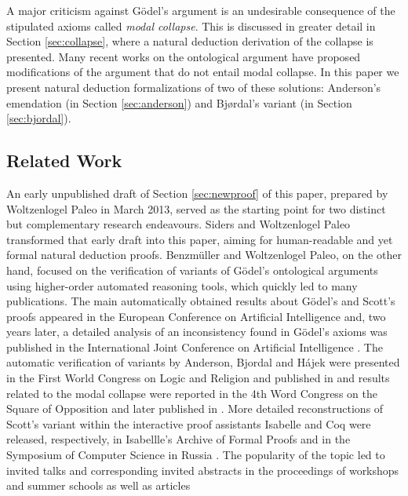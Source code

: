 \documentclass[smallextended]{svjour3}
\begin{document}
A major criticism against G\"odel's argument is an undesirable consequence of the stipulated axioms called \emph{modal collapse}. This is discussed in greater detail in Section \ref{sec:collapse}, where a natural deduction derivation of the collapse is presented. Many recent works on the ontological argument have proposed modifications of the argument that do not entail modal collapse. In this paper we present natural deduction formalizations of two of these solutions: Anderson's emendation (in Section \ref{sec:anderson}) and Bj{\o}rdal's variant (in Section \ref{sec:bjordal}).

\subsection{Related Work}

An early unpublished draft of Section \ref{sec:newproof} of this paper,
prepared by Woltzenlogel Paleo in March 2013, served as the starting
point for two distinct but complementary research endeavours. Siders
and Woltzenlogel Paleo transformed that early draft into this paper,
aiming for human-readable and yet formal natural deduction proofs.
Benzm\"uller and Woltzenlogel Paleo, on the other hand, focused on the
verification of variants of G\"odel's ontological arguments using
higher-order automated reasoning tools, which quickly led to many
publications. The main automatically obtained results about G\"odel's
and Scott's proofs appeared in the European Conference on Artificial
Intelligence \citep{ECAI2014} and, two years later, a detailed
analysis of an inconsistency found in G\"odel's axioms was published
in the International Joint Conference on Artificial Intelligence
\citep{IJCAI2016}. The automatic verification of variants by Anderson,
Bjordal and H\'ajek were presented in the First
World Congress on Logic and Religion
\citep{WorldCongressLogicAndReligion} and published in
\citep{controversy} and results related to the modal
collapse were reported in the 4th Word Congress on the Square of
Opposition \citep{SquareOfOpposition} and later published in
\citep{ModalCollapse}. More detailed reconstructions of Scott's
variant within the interactive proof assistants Isabelle and Coq were
released, respectively, in Isabellle's Archive of Formal Proofs
\citep{IsabelleGod} and in the Symposium of Computer Science in Russia
\citep{CSRModalLogicInCoq}. The popularity of the topic led to invited
talks and corresponding invited abstracts in the proceedings of
workshops \citep{WADT,WADTPreProceedings,IWIL} and summer schools
\citep{SpiritualQuest,ReasoningWebSummerSchool} as well as articles
\end{document}
